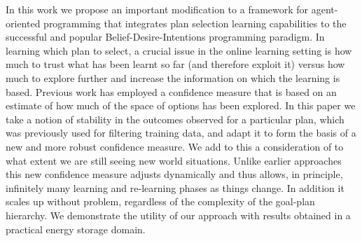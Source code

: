 In this work we propose an important modification to a framework for
agent-oriented programming that integrates plan selection
learning capabilities to the successful and popular
Belief-Desire-Intentions programming paradigm.
In learning which plan to select, a 
crucial issue in the online learning setting is how much to trust what
has been learnt so far (and therefore exploit it) versus how much to
explore further and increase the information on which the learning is
based. 
Previous work has employed a confidence measure that is based on an
estimate of how much of the space of options has been explored. 
In this paper we take a notion of stability in the outcomes observed
for a particular plan, which was previously used for filtering
training data, and adapt it to form the basis of a new and more robust
confidence measure. We add to this a consideration of to what extent
we are still seeing new world situations.  Unlike earlier approaches
this new confidence measure adjusts dynamically and thus allows, in
principle, infinitely many learning and re-learning phases as things
change. In addition it scales up without problem, regardless of the
complexity of the goal-plan hierarchy.
We demonstrate the utility of our approach with results obtained in a
practical energy storage domain. 

